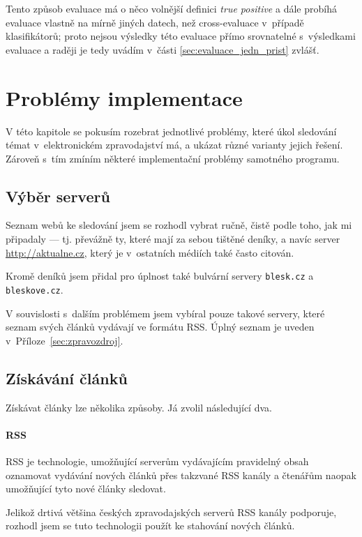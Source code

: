 \documentclass[12pt,a4paper]{report}
\begin{document}
Tento způsob evaluace má o něco volnější definici \emph{true positive} a dále probíhá evaluace vlastně na mírně jiných datech, než cross-evaluace v~případě klasifikátorů; proto nejsou výsledky této evaluace přímo srovnatelné s~výsledkami evaluace a raději je tedy uvádím v~části \ref{sec:evaluace_jedn_prist} zvlášť.



\chapter{Problémy implementace}
V této kapitole se pokusím rozebrat jednotlivé problémy, které úkol sledování témat v~elektronickém zpravodajství má, a ukázat různé varianty jejich řešení. Zároveň s~tím zmíním některé implementační problémy samotného programu.

\section{Výběr serverů}
Seznam webů ke sledování jsem se rozhodl vybrat ručně, čistě podle toho, jak  mi připadaly --- tj. převážně ty, které mají za sebou tištěné deníky, a navíc server \url{http://aktualne.cz}, který je v~ostatních médiích také často citován. 

Kromě  deníků jsem přidal pro úplnost také bulvární servery \texttt{blesk.cz} a \texttt{bleskove.cz}.

V souvislosti s~dalším problémem jsem vybíral pouze takové servery, které seznam svých článků vydávají ve formátu RSS. Úplný seznam je uveden v~Příloze~\ref{sec:zpravozdroj}.

\section{Získávání článků}
\label{sec:ziskavani}
Získávat články lze několika způsoby. Já zvolil následující dva.

\subsubsection{RSS}
RSS je technologie, umožňující serverům vydávajícím pravidelný obsah oznamovat vydávání nových článků přes takzvané RSS kanály a čtenářům naopak umožňující tyto nové články sledovat.

Jelikož drtivá většina českých zpravodajských serverů RSS kanály podporuje, rozhodl jsem se tuto technologii použít ke stahování nových článků.
\end{document}
